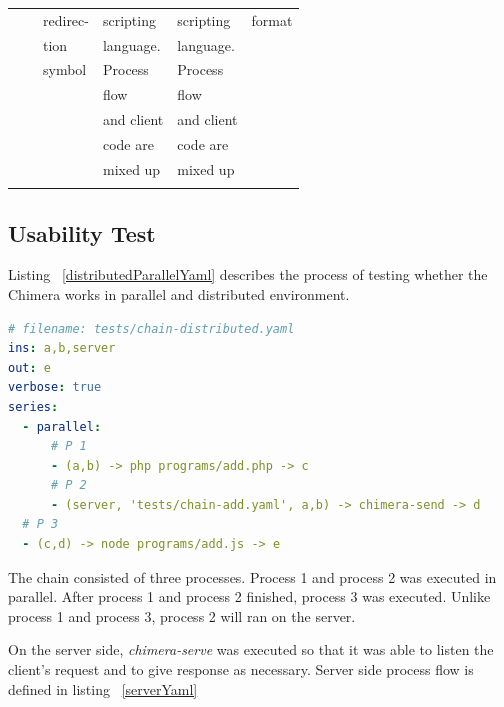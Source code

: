\documentclass[conference]{IEEEtran}
\begin{document}
\begin{table}[]
\begin{tabular}{@{}llllll@{}}
             &                 & redirec-      & scripting     & scripting     & format        \\
             &                 & tion          & language.     & language.     &               \\
             &                 & symbol        & Process       & Process       &               \\
             &                 &               & flow          & flow          &               \\
             &                 &               & and client    & and client    &               \\
             &                 &               & code are      & code are      &               \\
             &                 &               & mixed up      & mixed up      &               \\
             &                 &               &               &               &               \\ \bottomrule
\end{tabular}
\end{table}

\subsection{Usability Test}

Listing ~\ref{distributedParallelYaml} describes the process of testing whether the Chimera works
in parallel and distributed environment.

\begin{lstlisting}[caption=Distributed and Parallel Scenario YAML-chain Scenario, label=distributedParallelYaml, language=yaml, basicstyle=\small, breaklines=true]
# filename: tests/chain-distributed.yaml
ins: a,b,server
out: e
verbose: true
series:
  - parallel:
      # P 1
      - (a,b) -> php programs/add.php -> c
      # P 2
      - (server, 'tests/chain-add.yaml', a,b) -> chimera-send -> d
  # P 3
  - (c,d) -> node programs/add.js -> e
\end{lstlisting}

The chain consisted of three processes. Process 1 and process 2 was executed in parallel.
After process 1 and process 2 finished, process 3 was executed. Unlike process 1 and
process 3, process 2 will ran on the server.

On the server side, {\it chimera-serve} was executed so that it was able to listen the client's request
and to give response as necessary. Server side process flow is defined in listing ~\ref{serverYaml}
\end{document}

